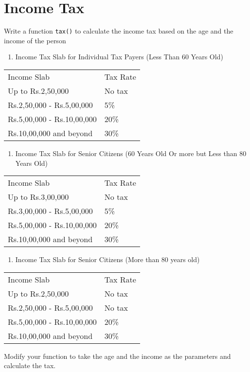 \documentclass[11pt]{article}
\begin{document}
\section{Income Tax}
\label{sec-7}
Write a function \texttt{tax()} to calculate the income tax based on the age and the income 
of the person
\begin{enumerate}
\item Income Tax Slab for Individual Tax Payers (Less Than 60 Years Old)
\end{enumerate}
\begin{center}
\begin{tabular}{ll}
Income Slab & Tax Rate\\
Up to Rs.2,50,000 & No tax\\
Rs.2,50,000 - Rs.5,00,000 & 5\%\\
Rs.5,00,000 - Rs.10,00,000 & 20\%\\
Rs.10,00,000 and beyond & 30\%\\
\end{tabular}
\end{center}
\begin{enumerate}
\item Income Tax Slab for Senior Citizens (60 Years Old Or more but Less than 80 Years Old)
\end{enumerate}
\begin{center}
\begin{tabular}{ll}
Income Slab & Tax Rate\\
Up to Rs.3,00,000 & No tax\\
Rs.3,00,000 - Rs.5,00,000 & 5\%\\
Rs.5,00,000 - Rs.10,00,000 & 20\%\\
Rs.10,00,000 and beyond & 30\%\\
\end{tabular}
\end{center}
\begin{enumerate}
\item Income Tax Slab for Senior Citizens (More than 80 years old)
\end{enumerate}
\begin{center}
\begin{tabular}{ll}
Income Slab & Tax Rate\\
Up to Rs.2,50,000 & No tax\\
Rs.2,50,000 - Rs.5,00,000 & No tax\\
Rs.5,00,000 - Rs.10,00,000 & 20\%\\
Rs.10,00,000 and beyond & 30\%\\
\end{tabular}
\end{center}
Modify your function to take the age and the income as the parameters and calculate the tax.
\end{document}
